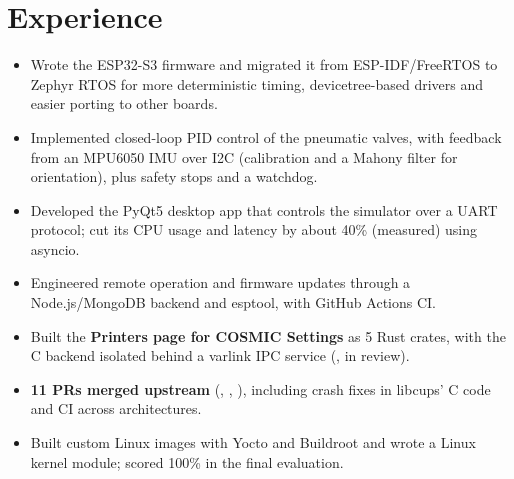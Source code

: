 \documentclass[10pt]{article}
\begin{document}
\section*{Experience}
\begin{itemize}
  \item Wrote the ESP32-S3 firmware and migrated it from ESP-IDF/FreeRTOS to Zephyr RTOS for more deterministic timing, devicetree-based drivers and easier porting to other boards.
  \item Implemented closed-loop PID control of the pneumatic valves, with feedback from an MPU6050 IMU over I2C (calibration and a Mahony filter for orientation), plus safety stops and a watchdog.
  \item Developed the PyQt5 desktop app that controls the simulator over a UART protocol; cut its CPU usage and latency by about 40\% (measured) using asyncio.
  \item Engineered remote operation and firmware updates through a Node.js/MongoDB backend and esptool, with GitHub Actions CI.
\end{itemize}
\begin{itemize}
  \item Built the \textbf{Printers page for COSMIC Settings} as 5 Rust crates, with the C backend isolated behind a varlink IPC service (, in review).
  \item \textbf{11 PRs merged upstream} (, , ), including crash fixes in libcups' C code and CI across architectures.
\end{itemize}
\begin{itemize}
  \item Built custom Linux images with Yocto and Buildroot and wrote a Linux kernel module; scored 100\% in the final evaluation.
\end{itemize}
\end{document}
